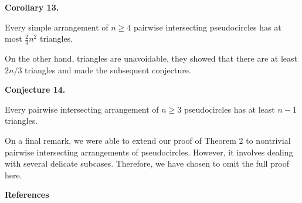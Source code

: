 \par
\par
\par\medskip\noindent\textbf{Corollary 13.}\par
Every simple arrangement of $n\geqslant 4$ pairwise intersecting pseudocircles has at most $\frac{2}{3}n^{2}$ triangles.
\par
\par
\par
On the other hand, triangles are unavoidable, they showed that there are at least $2n/3$ triangles and made the subsequent conjecture.
\par
\par
\par\medskip\noindent\textbf{Conjecture 14.}\par
Every pairwise intersecting arrangement of $n\geqslant 3$ pseudocircles has at least $n-1$ triangles.
\par
\par
\par
On a final remark, we were able to extend our proof of Theorem 2 to nontrivial pairwise intersecting arrangements of pseudocircles. However, it involves dealing with several delicate subcases. Therefore, we have chosen to omit the full proof here.
\par
\par
\par\medskip\noindent\textbf{References}\par
